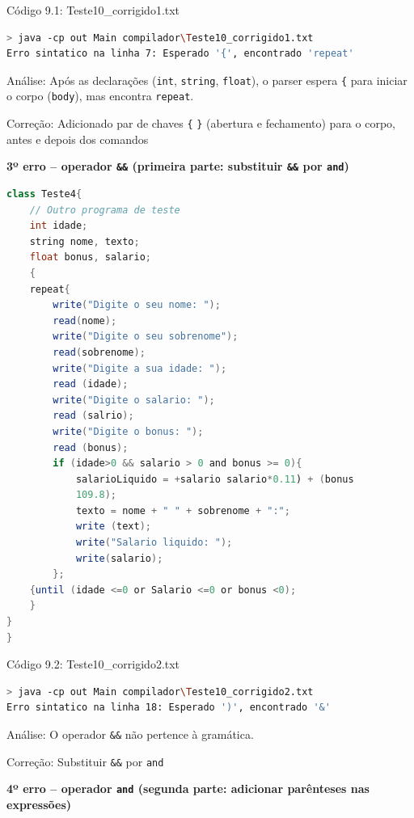\documentclass[12pt,a4paper]{article}
\begin{document}
Código 9.1: Teste10\_corrigido1.txt

\begin{lstlisting}[language=bash]
> java -cp out Main compilador\Teste10_corrigido1.txt
Erro sintatico na linha 7: Esperado '{', encontrado 'repeat'
\end{lstlisting}

Análise: Após as declarações (\texttt{int}, \texttt{string}, \texttt{float}), o parser espera \texttt{\{} para iniciar o corpo (\texttt{body}), mas encontra \texttt{repeat}.

Correção: Adicionado par de chaves \texttt{\{} \texttt{\}} (abertura e fechamento) para o corpo, antes e depois dos comandos

\textbf{3º erro -- operador \texttt{\&\&} (primeira parte: substituir \texttt{\&\&} por \texttt{and})}

\begin{lstlisting}[language=Java]
class Teste4{
    // Outro programa de teste
    int idade;
    string nome, texto;
    float bonus, salario;
    {
    repeat{
        write("Digite o seu nome: ");
        read(nome);
        write("Digite o seu sobrenome");
        read(sobrenome);
        write("Digite a sua idade: ");
        read (idade);
        write("Digite o salario: ");
        read (salrio);
        write("Digite o bonus: ");
        read (bonus);
        if (idade>0 && salario > 0 and bonus >= 0){
            salarioLiquido = +salario salario*0.11) + (bonus
            109.8);
            texto = nome + " " + sobrenome + ":";
            write (text);
            write("Salario liquido: ");
            write(salario);
        };
    {until (idade <=0 or Salario <=0 or bonus <0);
    }
}
}
\end{lstlisting}

Código 9.2: Teste10\_corrigido2.txt

\begin{lstlisting}[language=bash]
> java -cp out Main compilador\Teste10_corrigido2.txt
Erro sintatico na linha 18: Esperado ')', encontrado '&'
\end{lstlisting}

Análise: O operador \texttt{\&\&} não pertence à gramática.

Correção: Substituir \texttt{\&\&} por \texttt{and}

\textbf{4º erro -- operador \texttt{and} (segunda parte: adicionar parênteses nas expressões)}
\end{document}
